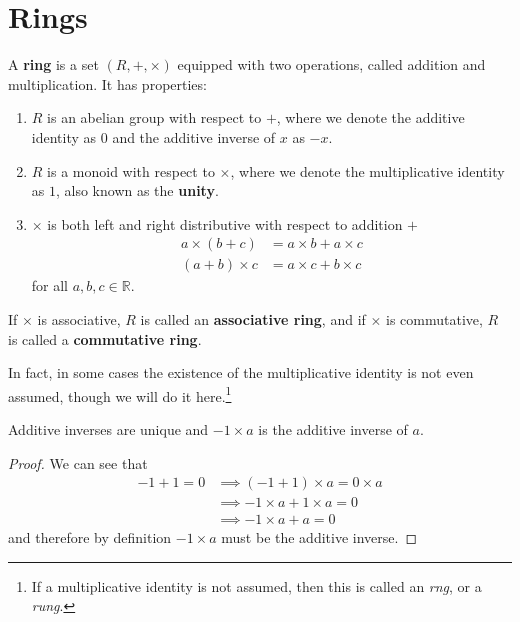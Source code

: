 \section{Rings} 

  \begin{definition}[Ring]
    A \textbf{ring} is a set $(R, +, \times)$ equipped with two operations, called addition and multiplication. It has properties: 
    \begin{enumerate}
      \item $R$ is an abelian group with respect to $+$, where we denote the additive identity as $0$ and the additive inverse of $x$ as $-x$. 
      \item $R$ is a monoid with respect to $\times$, where we denote the multiplicative identity as $1$, also known as the \textbf{unity}. 
      \item $\times$ is both left and right distributive with respect to addition $+$
      \begin{align}
        a \times (b + c) & = a\times b + a\times c \\ 
        (a + b) \times c & = a\times c + b\times c 
      \end{align}
      for all $a, b, c \in \mathbb{R}$. 
    \end{enumerate} 
    If $\times$ is associative, $R$ is called an \textbf{associative ring}, and if $\times$ is commutative, $R$ is called a \textbf{commutative ring}. 
  \end{definition}

  In fact, in some cases the existence of the multiplicative identity is not even assumed, though we will do it here.\footnote{If a multiplicative identity is not assumed, then this is called an \textit{rng}, or a \textit{rung}.}

  \begin{lemma} 
    Additive inverses are unique and $-1 \times a$ is the additive inverse of $a$. 
  \end{lemma}
  \begin{proof}
    We can see that 
    \begin{align}
      -1 + 1 = 0 & \implies (-1 + 1) \times a = 0 \times a \\
                 & \implies -1 \times a + 1 \times a = 0 \\
                 & \implies -1 \times a + a = 0 
    \end{align}
    and therefore by definition $-1 \times a$ must be the additive inverse. 
  \end{proof} 

